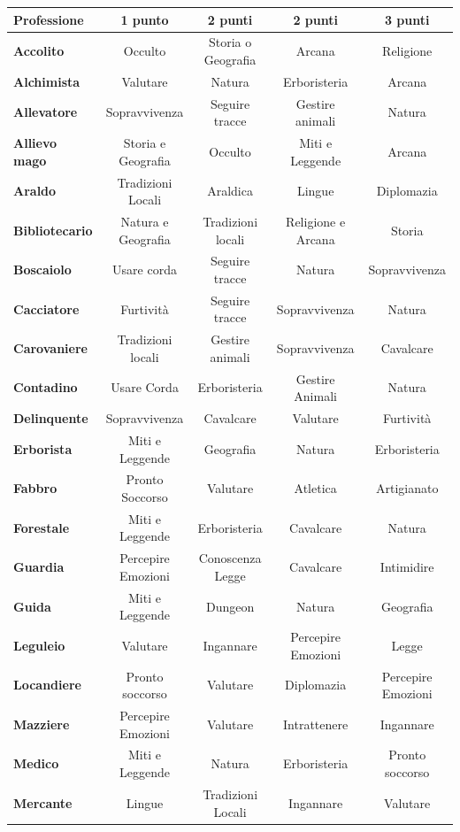 \noindent\begin{tabularx}{\textwidth}{>{\raggedright\arraybackslash}l|c|c|c|c}
	\toprule
\textbf{Professione}& \textbf{1 punto} & \textbf{2 punti} & \textbf{2 punti} & \textbf{3 punti}\\
\toprule
\textbf{Accolito}& Occulto& Storia o Geografia& Arcana& Religione\\
\textbf{Alchimista}& Valutare&Natura& Erboristeria& Arcana\\
\textbf{Allevatore}& Sopravvivenza&Seguire tracce& Gestire animali&Natura \\
\textbf{Allievo mago}& Storia e Geografia&Occulto&Miti e Leggende&Arcana\\
\textbf{Araldo} & Tradizioni Locali & Araldica & Lingue & Diplomazia \\
\textbf{Bibliotecario}& Natura e Geografia&Tradizioni locali&Religione e Arcana&Storia\\
\textbf{Boscaiolo}& Usare corda&Seguire tracce & Natura& Sopravvivenza\\
\textbf{Cacciatore}& Furtività&Seguire tracce&Sopravvivenza& Natura\\
\textbf{Carovaniere}&Tradizioni locali &Gestire animali&Sopravvivenza&Cavalcare\\
\textbf{Contadino} & Usare Corda & Erboristeria & Gestire Animali& Natura\\
\textbf{Delinquente}& Sopravvivenza&Cavalcare&Valutare&Furtività\\
\textbf{Erborista}& Miti e Leggende&Geografia&Natura&Erboristeria\\
\textbf{Fabbro} & Pronto Soccorso & Valutare&Atletica & Artigianato \\
\textbf{Forestale}& Miti e Leggende&Erboristeria&Cavalcare & Natura\\
\textbf{Guardia}& Percepire Emozioni&Conoscenza Legge&Cavalcare&Intimidire\\
\textbf{Guida}& Miti e Leggende&Dungeon&Natura&Geografia\\
\textbf{Leguleio}& Valutare&Ingannare&Percepire Emozioni&Legge\\
\textbf{Locandiere}& Pronto soccorso&Valutare&Diplomazia&Percepire Emozioni\\
\textbf{Mazziere}& Percepire Emozioni&Valutare&Intrattenere&Ingannare\\
\textbf{Medico}& Miti e Leggende&Natura&Erboristeria&Pronto soccorso\\
\textbf{Mercante}& Lingue&Tradizioni Locali&Ingannare&Valutare\\

\end{tabularx}
